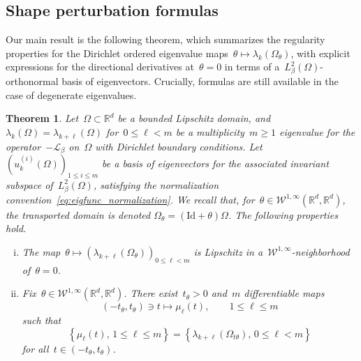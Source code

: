 \documentclass[a4]{article}
\newcommand{\cL}{\mathcal{L}}
\newcommand{\R}{\mathbb{R}}
\newcommand{\1}{\mathbbm 1}
\newcommand{\Winf}{{{\cW}^{1,\infty}}}
\newcommand{\Id}{\mathrm{Id}}
\newcommand{\cW}{\mathcal{W}}
\newtheorem{theorem}{Theorem}
\begin{document}
    \subsection{Shape perturbation formulas}
    \label{subsec:shape_perturbation_formulas}
    Our main result is the following theorem, which summarizes the regularity properties for the Dirichlet ordered eigenvalue maps~$\theta\mapsto \lambda_k(\Omega_\theta)$, with explicit expressions for the directional derivatives at~$\theta=0$ in terms of a~$L^2_\beta(\Omega)$-orthonormal basis of eigenvectors.
    Crucially, formulas are still available in the case of degenerate eigenvalues.
\begin{theorem}
    \label{thm:gateaux_differentiability}
    Let~$\Omega\subset \R^d$ be a bounded Lipschitz domain, and~$\lambda_k(\Omega)=\lambda_{k+\ell}(\Omega)$ for~$0\leq \ell < m$ be a  multiplicity~$m\geq 1$ eigenvalue for the operator~$-\cL_\beta$ on~$\Omega$ with Dirichlet boundary conditions. Let~$\left(u_k^{(i)}(\Omega)\right)_{1\leq i\leq m}$ be a basis of eigenvectors for the associated invariant subspace of~$L^2_\beta(\Omega)$, satisfying the normalization convention~\eqref{eq:eigfunc_normalization}.
    We recall that, for~$\theta\in\Winf\left(\R^d,\R^d\right)$, the transported domain is denoted $\Omega_\theta = (\Id+\theta)\Omega$. The following properties hold.
        \begin{enumerate}[i)]
        \item{
        The map~$\theta\mapsto \left(\lambda_{k+\ell}(\Omega_\theta)\right)_{0\leq \ell < m}$
        is Lipschitz in a~$\Winf$-neighborhood of~$\theta=0$.
        }
        \item{
        Fix~$\theta\in\Winf\left(\R^d,\R^d\right)$. There exist~$t_\theta>0$ and~$m$ differentiable maps
        \begin{equation}
            (-t_\theta,t_\theta)\ni t \mapsto \mu_\ell(t),\qquad 1\leq \ell\leq m
        \end{equation}
        such that~
        \begin{equation}
            \label{eq:multiset}
            \left\{\mu_\ell(t),\,1\leq \ell\leq m\right\} = \left\{ \lambda_{k+\ell}(\Omega_{t\theta}),\,0\leq \ell<m\right\}
        \end{equation}
        for all~$t\in(-t_\theta,t_\theta)$.

}
\end{enumerate}
\end{theorem}
\end{document}
